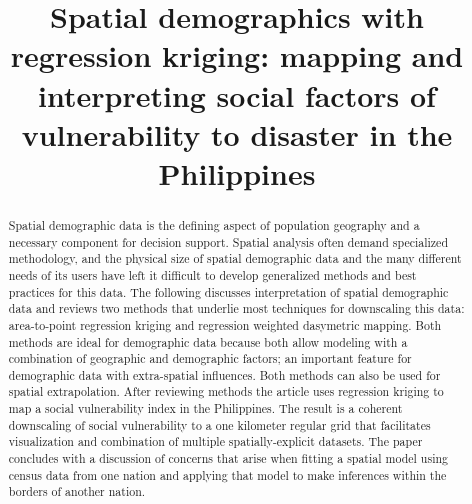 \documentclass[draft]{article}
\title{Spatial demographics with regression kriging: mapping and interpreting social factors of vulnerability to disaster in the Philippines}
\date{} %
\begin{document}
\maketitle
\newpage

\begin{abstract}
  Spatial demographic data is the defining aspect of population geography and a necessary component for decision support.  Spatial analysis often demand specialized methodology, and the physical size of spatial demographic data and the many different needs of its users have left it difficult to develop generalized methods and best practices for this data.  The following discusses interpretation of spatial demographic data and reviews two methods that underlie most techniques for downscaling this data: area-to-point regression kriging and regression weighted dasymetric mapping.  Both methods are ideal for demographic data because both allow modeling with a combination of geographic and demographic factors; an important feature for demographic data with extra-spatial influences.  Both methods can also be used for spatial extrapolation.  After reviewing methods the article uses regression kriging to map a social vulnerability index in the Philippines.  The result is a coherent downscaling of social vulnerability to a one kilometer regular grid that facilitates visualization and combination of multiple spatially-explicit datasets.  The paper concludes with a discussion of concerns that arise when fitting a spatial model using census data from one nation and applying that model to make inferences within the borders of another nation.
\end{abstract}

\end{document}
